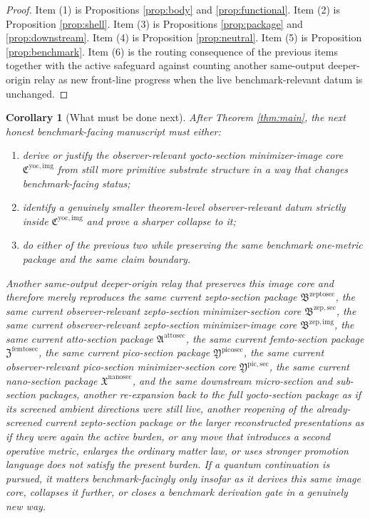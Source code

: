 \documentclass[11pt]{article}
\newcommand{\NanoSectionPackage}{\mathfrak X^{\mathrm{nanosec}}}
\newcommand{\PicoSectionPackage}{\mathfrak Y^{\mathrm{picosec}}}
\newcommand{\PicoMinSectionCore}{\mathfrak Y^{\mathrm{pic,sec}}}
\newcommand{\FemtoSectionPackage}{\mathfrak Z^{\mathrm{femtosec}}}
\newcommand{\AttoSectionPackage}{\mathfrak A^{\mathrm{attosec}}}
\newcommand{\ZeptoSectionPackage}{\mathfrak B^{\mathrm{zeptosec}}}
\newcommand{\ZeptoImageCore}{\mathfrak B^{\mathrm{zep,img}}}
\newcommand{\ZeptoMinSectionCore}{\mathfrak B^{\mathrm{zep,sec}}}
\newcommand{\YoctoImageCore}{\mathfrak C^{\mathrm{yoc,img}}}
\newtheorem{corollary}{Corollary}
\begin{document}
\begin{proof}
Item (1) is Propositions \ref{prop:body} and \ref{prop:functional}. Item (2) is Proposition \ref{prop:shell}. Item (3) is Propositions \ref{prop:package} and \ref{prop:downstream}. Item (4) is Proposition \ref{prop:neutral}. Item (5) is Proposition \ref{prop:benchmark}. Item (6) is the routing consequence of the previous items together with the active safeguard against counting another same-output deeper-origin relay as new front-line progress when the live benchmark-relevant datum is unchanged.
\end{proof}

\begin{corollary}[What must be done next]
\label{cor:next}
After Theorem \ref{thm:main}, the next honest benchmark-facing manuscript must either:
\begin{enumerate}
    \item derive or justify the observer-relevant yocto-section minimizer-image core \(\YoctoImageCore\) from still more primitive substrate structure in a way that changes benchmark-facing status;
    \item identify a genuinely smaller theorem-level observer-relevant datum strictly inside \(\YoctoImageCore\) and prove a sharper collapse to it;
    \item do either of the previous two while preserving the same benchmark one-metric package and the same claim boundary.
\end{enumerate}
Another same-output deeper-origin relay that preserves this image core and therefore merely reproduces the same current zepto-section package \(\ZeptoSectionPackage\), the same current observer-relevant zepto-section minimizer-section core \(\ZeptoMinSectionCore\), the same current observer-relevant zepto-section minimizer-image core \(\ZeptoImageCore\), the same current atto-section package \(\AttoSectionPackage\), the same current femto-section package \(\FemtoSectionPackage\), the same current pico-section package \(\PicoSectionPackage\), the same current observer-relevant pico-section minimizer-section core \(\PicoMinSectionCore\), the same current nano-section package \(\NanoSectionPackage\), and the same downstream micro-section and sub-section packages, another re-expansion back to the full yocto-section package as if its screened ambient directions were still live, another reopening of the already-screened current zepto-section package or the larger reconstructed presentations as if they were again the active burden, or any move that introduces a second operative metric, enlarges the ordinary matter law, or uses stronger promotion language does not satisfy the present burden. If a quantum continuation is pursued, it matters benchmark-facingly only insofar as it derives this same image core, collapses it further, or closes a benchmark derivation gate in a genuinely new way.
\end{corollary}
\end{document}
